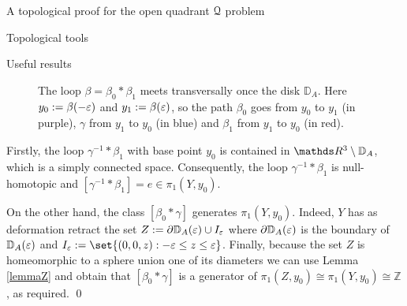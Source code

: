 \documentclass[11pt, a4paper, english, twoside, notitlepage, openright]{report}
\begin{document}
\begin{chapter}{A topological proof for the open quadrant $\mathcal{Q}$ problem}
\begin{section}{Topological tools}
\begin{subsection}{Useful results}
\begin{lemma}
\begin{Proof}
\begin{figure}[ht!]
\begin{center}
\caption{The loop $\beta=\beta_0\ast\beta_1$ meets transversally once the disk ${\mathbb D}_A$. Here $y_0:=\beta(-\varepsilon)$ and $y_1:=\beta(\varepsilon)$, so the path $\beta_0$ goes from $y_0$ to $y_1$ (in purple), $\gamma$ from $y_1$ to $y_0$ (in blue) and $\beta_1$ from $y_1$ to $y_0$ (in red).}\label{fig:disc}
\end{center}
\end{figure}

Firstly, the loop $\gamma^{-1}\ast\beta_1$ with base point $y_0$ is contained in $\R^3\setminus{\mathbb D}_A$, which is a simply connected space. Consequently, the loop $\gamma^{-1}*\beta_1$ is null-homotopic and $[\gamma^{-1}*\beta_1]=e \in \pi_1(Y,y_0)$.

On the other hand, the class $[\beta_0\ast\gamma]$ generates $\pi_1(Y,y_0)$. Indeed, $Y$ has as deformation retract the set $Z:=\partial{\mathbb D}_A(\varepsilon)\cup I_\varepsilon$ where $\partial{\mathbb D}_A(\varepsilon)$ is the boundary of ${\mathbb D}_A(\varepsilon)$ and $I_\eps:=\set{(0,0,z):-\eps\le z\le \eps}$. Finally, because the set $Z$ is homeomorphic to a sphere union one of its diameters we can use Lemma \ref{lemmaZ} and obtain that $[\beta_0\ast\gamma]$ is a generator of $\pi_1(Z,y_0)\cong\pi_1(Y,y_0)\cong{\mathbb Z}$, as required.
\qed 
\end{Proof}
\end{lemma}


\end{subsection}
\end{section}
\end{chapter}
\end{document}
